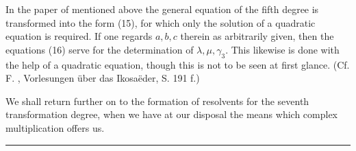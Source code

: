 
In the paper of  mentioned above the general equation of the fifth degree is transformed into the form (15), for which only the solution of a quadratic equation is required. If one regards $a, b, c$ therein as arbitrarily given, then the equations (16) serve for the determination of $\lambda, \mu, \gamma_3$. This likewise is done with the help of a quadratic equation, though this is not to be seen at first glance. (Cf. F. , Vorlesungen über das Ikosa\"eder, S. 191 f.)

We shall return further on to the formation of resolvents for the seventh transformation degree, when we have at our disposal the means which complex multiplication offers us.

\begin{center}\rule{0.2\linewidth}{0.4pt}\end{center}
